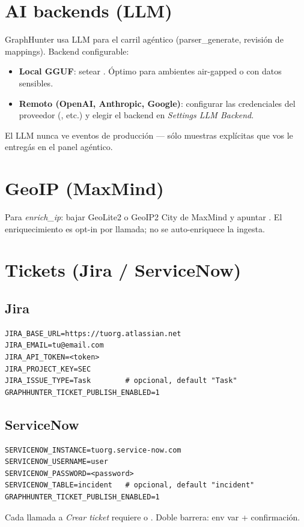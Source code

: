 \section{AI backends (LLM)}

GraphHunter usa LLM para el carril agéntico (parser\_generate,
revisión de mappings). Backend configurable:

\begin{itemize}
    \item \textbf{Local GGUF}: setear
    . Óptimo
    para ambientes air-gapped o con datos sensibles.
    \item \textbf{Remoto (OpenAI, Anthropic, Google)}: configurar
    las credenciales del proveedor (, etc.) y
    elegir el backend en \emph{Settings \textrightarrow{} LLM
    Backend}.
\end{itemize}

El LLM nunca ve eventos de producción — sólo muestras explícitas
que vos le entregás en el panel agéntico.

\section{GeoIP (MaxMind)}

Para \emph{enrich\_ip}: bajar GeoLite2 o GeoIP2 City de MaxMind y
apuntar . El
enriquecimiento es opt-in por llamada; no se auto-enriquece la
ingesta.

\section{Tickets (Jira / ServiceNow)}

\subsection{Jira}

\begin{lstlisting}[basicstyle=\ttfamily\small]
JIRA_BASE_URL=https://tuorg.atlassian.net
JIRA_EMAIL=tu@email.com
JIRA_API_TOKEN=<token>
JIRA_PROJECT_KEY=SEC
JIRA_ISSUE_TYPE=Task        # opcional, default "Task"
GRAPHHUNTER_TICKET_PUBLISH_ENABLED=1
\end{lstlisting}

\subsection{ServiceNow}

\begin{lstlisting}[basicstyle=\ttfamily\small]
SERVICENOW_INSTANCE=tuorg.service-now.com
SERVICENOW_USERNAME=user
SERVICENOW_PASSWORD=<password>
SERVICENOW_TABLE=incident   # opcional, default "incident"
GRAPHHUNTER_TICKET_PUBLISH_ENABLED=1
\end{lstlisting}

Cada llamada a \emph{Crear ticket} requiere  o
. Doble barrera: env var + confirmación.
